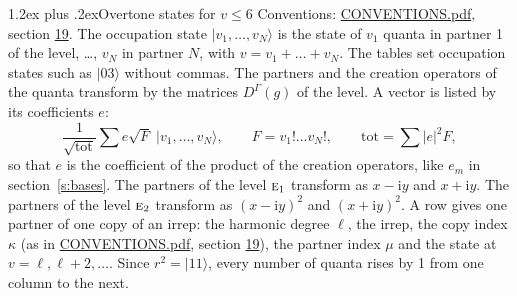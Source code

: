 \documentclass[10pt,a4paper]{article}
\makeatletter
\renewcommand\section{\@startsection{section}{1}{\z@}{-3ex plus -1ex minus -.2ex}%
  {1.2ex plus .2ex}{\normalfont\large\sffamily\bfseries\color{parttitle}}}
\numberwithin{equation}{section}
\newcommand{\irr}[1]{\text{\normalfont\scshape #1}}
\newcommand{\iunit}{\mathrm{i}}
\newcommand{\repD}[1]{D^{#1}}
\newcommand{\mult}{\kappa}
\newcommand{\intx}{\mu}
\newcommand{\occ}[1]{\lvert #1\rangle}
\makeatother
\begin{document}
\section{Overtone states for \texorpdfstring{$v \le 6$}{v \textleq\ 6}}\label{s:overtone_states}
Conventions: \href{../../CONVENTIONS.pdf}{CONVENTIONS.pdf}, section \href{../../CONVENTIONS.pdf\#conv.19}{19}.
\leavevmode\label{n:vector.occupation}\label{n:local.quanta.partner}\label{n:local.weight.occupation}The occupation state $\occ{v_1, \dots, v_N}$ is the state of $v_1$ quanta in partner 1 of the level, \dots, $v_N$ in partner $N$, with $v = v_1 + \dots + v_N$. The tables set occupation states such as $\occ{03}$ without commas. The partners and the creation operators of the quanta transform by the matrices $\repD{\Gamma}(g)$ of the level. A vector is listed by its coefficients $e$:
\begin{equation}\label{e:occupation}\frac{1}{\sqrt{\mathrm{tot}}}\sum e\sqrt{F}\;\occ{v_1, \dots, v_N},\qquad F = v_1!\dots v_N!,\qquad \mathrm{tot} = \sum |e|^2F,\end{equation}
so that $e$ is the coefficient of the product of the creation operators, like $e_m$ in section~\ref{s:bases}. The partners of the level $\irr{e}_{1}$ transform as $x - \iunit y$ and $x + \iunit y$. The partners of the level $\irr{e}_{2}$ transform as $(x - \iunit y)^{2}$ and $(x + \iunit y)^{2}$. A row gives one partner of one copy of an irrep: the harmonic degree $\ell$, the irrep, the copy index $\mult$ (as in \href{../../CONVENTIONS.pdf}{CONVENTIONS.pdf}, section \href{../../CONVENTIONS.pdf\#conv.19}{19}), the partner index $\intx$ and the state at $v = \ell, \ell + 2, \dots$. Since $r^2 = \occ{11}$, every number of quanta rises by 1 from one column to the next.
\end{document}
